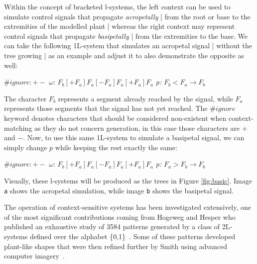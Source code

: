 \documentclass[]{final_report}
\begin{document}
Within the concept of bracketed l-systems, the left context can be used to simulate control signals that propagate \emph{acropetally} | from the root or base to the extremities of the modelled plant | whereas the right context may represent control signals that propagate \emph{basipetally} | from the extremities to the base. We can take the following 1L-system that simulates an acropetal signal | without the tree growing | as an example and adjust it to also demonstrate the opposite as well:
\begin{center}
    \begin{minipage}[c]{5cm}
        $\# ignore:+ -$\newline\newline
        $\omega$: $F_b[+F_a]F_a[−F_a]F_a[+F_a]F_a$\newline
        \emph{p:} $F_b<F_a \rightarrow F_b$
    \end{minipage}
\end{center}
The character $F_b$ represents a segment already reached by the signal, while $F_a$ represents those segments that the signal has not yet reached. The $\#ignore$ keyword denotes characters that should be considered non-existent when context-matching as they do not concern generation, in this case those characters are $+$ and $-$. Now, to use this same 1L-system to simulate a basipetal signal, we can simply change $p$ while keeping the rest exactly the same:
\begin{center}
    \begin{minipage}[c]{5cm}
        $\# ignore:+ -$\newline\newline
        $\omega$: $F_b[+F_a]F_a[−F_a]F_a[+F_a]F_a$\newline
        \emph{p:} $F_a>F_b \rightarrow F_b$
    \end{minipage}
\end{center}
Visually, these l-systems will be produced as the trees in Figure \ref{fig:basic}. Image \verb|a| shows the acropetal simulation, while image \verb|b| shows the basipetal signal.

The operation of context-sensitive systems has been investigated extensively, one of the most significant contributions coming from Hogeweg and Hesper who published an exhaustive study of 3584 patterns generated by a class of 2L-systems defined over the alphabet \{0,1\}~\cite{HOG:1974}. Some of these patterns developed plant-like shapes that were then refined further by Smith using advanced computer imagery~\cite{ARS:1984}.
\end{document}
